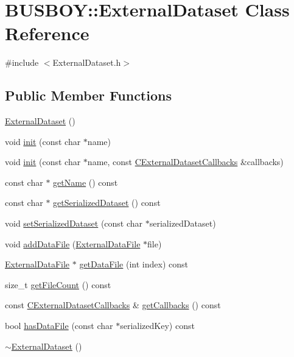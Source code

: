 \hypertarget{classBUSBOY_1_1ExternalDataset}{
\section{BUSBOY::ExternalDataset Class Reference}
\label{classBUSBOY_1_1ExternalDataset}
}


{\ttfamily \#include $<$ExternalDataset.h$>$}\subsection*{Public Member Functions}
\begin{DoxyCompactItemize}
\item 
\hyperlink{classBUSBOY_1_1ExternalDataset_a5517ac1a6ea84a1593e94f801b90c589}{ExternalDataset} ()
\item 
void \hyperlink{classBUSBOY_1_1ExternalDataset_afd6a0915ac381e9f0718c02bdab4295c}{init} (const char $\ast$name)
\item 
void \hyperlink{classBUSBOY_1_1ExternalDataset_a6eaec0cd10e6357d48af66e3a0d770e7}{init} (const char $\ast$name, const \hyperlink{structCExternalDatasetCallbacksStruct}{CExternalDatasetCallbacks} \&callbacks)
\item 
const char $\ast$ \hyperlink{classBUSBOY_1_1ExternalDataset_a8125089aa997ab26a115820951e17363}{getName} () const 
\item 
const char $\ast$ \hyperlink{classBUSBOY_1_1ExternalDataset_ad757fc5cf9424644dbcea27060f87492}{getSerializedDataset} () const 
\item 
void \hyperlink{classBUSBOY_1_1ExternalDataset_ae665e4a6d9308cd1637645e57ab5fa79}{setSerializedDataset} (const char $\ast$serializedDataset)
\item 
void \hyperlink{classBUSBOY_1_1ExternalDataset_a8b45a79432fd8c06fab25d8d3c27a49f}{addDataFile} (\hyperlink{classBUSBOY_1_1ExternalDataFile}{ExternalDataFile} $\ast$file)
\item 
\hyperlink{classBUSBOY_1_1ExternalDataFile}{ExternalDataFile} $\ast$ \hyperlink{classBUSBOY_1_1ExternalDataset_a9df59df2039abbe0171ed8ff33ba5d9c}{getDataFile} (int index) const 
\item 
size\_\-t \hyperlink{classBUSBOY_1_1ExternalDataset_adb7bdaf990a57db360a1144caf44ee59}{getFileCount} () const 
\item 
const \hyperlink{structCExternalDatasetCallbacksStruct}{CExternalDatasetCallbacks} \& \hyperlink{classBUSBOY_1_1ExternalDataset_a5fd6d9135a9325f4991c8c5245286db2}{getCallbacks} () const 
\item 
bool \hyperlink{classBUSBOY_1_1ExternalDataset_a3503bb02f3364cbf244b5c7a8e777a52}{hasDataFile} (const char $\ast$serializedKey) const 
\item 
\hyperlink{classBUSBOY_1_1ExternalDataset_a17551ab8422fadcfc57ec0ebaab29ee6}{$\sim$ExternalDataset} ()
\end{DoxyCompactItemize}


